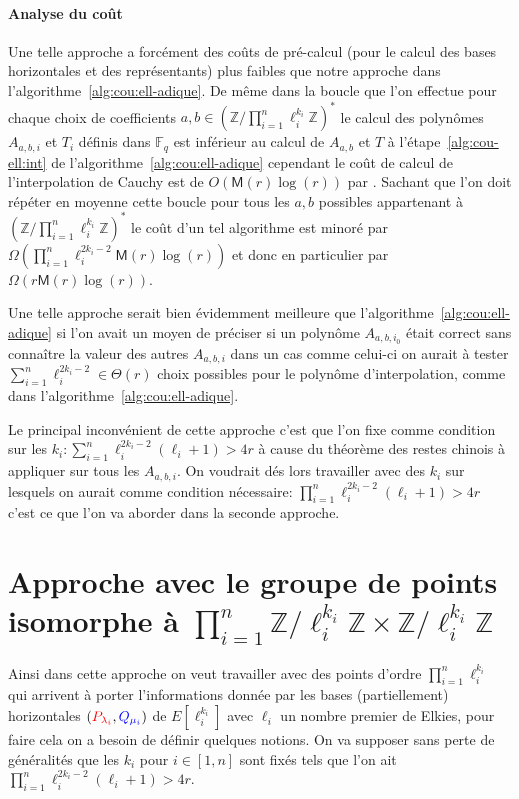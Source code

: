 \documentclass[10pt,a4paper]{book}
\theoremstyle{plain}
\theoremstyle{definition}
\theoremstyle{definition}
\theoremstyle{definition}
\theoremstyle{definition}
\theoremstyle{remark}
\theoremstyle{remark}
\theoremstyle{definition}
\begin{document}
\paragraph{Analyse du coût}
{Une telle approche a forcément des coûts de pré-calcul (pour le calcul des bases 
horizontales et des représentants) plus faibles que notre approche dans 
l'algorithme~\ref{alg:cou:ell-adique}. De même dans la boucle que l'on effectue
 pour chaque choix de coefficients $a,b \in (\mathbb{Z}/\prod_{i=1}^n\ell_i^{k_i} \mathbb{Z})^*$
le calcul des polynômes $A_{a,b,i}$ et $T_i$ définis dans $\mathbb{F}_q$ est 
inférieur au calcul de $A_{a,b}$ et $T$ à l'étape~\ref{alg:cou-ell:int} de 
l'algorithme~\ref{alg:cou:ell-adique} cependant le coût de calcul de 
l'interpolation de Cauchy  est de $O(\mathsf{M}(r)\log(r))$ par
 \cite[Théorème 7.5]{algeff17}. Sachant que l'on doit répéter en moyenne cette 
boucle pour tous les $a,b$ possibles appartenant à $(\mathbb{Z}/\prod_{i=1}^n\ell_i^{k_i} \mathbb{Z})^*$
 le coût d'un tel algorithme est minoré par $\Omega(\prod_{i=1}^n\ell_i^{2k_i-2}
 \mathsf{M}(r)\log(r))$ et donc en particulier par $\Omega(r\mathsf{M}(r)
 \log(r))$. 

Une telle approche serait bien évidemment meilleure que 
l'algorithme~\ref{alg:cou:ell-adique} si l'on avait un moyen de préciser si un 
polynôme $A_{a,b,i_0}$ était correct sans connaître la valeur des autres 
$A_{a,b,i}$ dans un cas comme celui-ci on aurait à tester 
$\sum_{i=1}^n \ell_i^{2k_i-2} \in \Theta(r)$ choix possibles pour le polynôme 
d'interpolation, comme dans l'algorithme~\ref{alg:cou:ell-adique}.

Le principal inconvénient de cette approche 
c'est que l'on fixe comme condition sur les $k_i: \sum_{i=1}^n\ell_i^{2k_{i}-2}(\ell_i+1)>4r$
à cause du théorème des restes chinois à appliquer sur tous les $A_{a,b,i}$. 
On voudrait dés lors travailler avec des $k_i$ sur lesquels on aurait comme 
condition nécessaire: $\prod_{i=1}^n\ell_i^{2k_{i}-2}(\ell_i+1)>4r$
c'est ce que l'on va aborder dans la seconde approche.}

\section{Approche avec le groupe de points isomorphe à $\prod_{i=1}^n \mathbb{Z}/\ell_i^{k_i} \mathbb{Z} \times \mathbb{Z}/\ell_i^{k_i} \mathbb{Z} $}
Ainsi dans cette approche on veut travailler avec des points d'ordre 
$\prod_{i=1}^{n} \ell_i^{k_i}$ qui arrivent à porter l'informations donnée par 
les  bases (partiellement) horizontales 
$(\color{red}P_{\lambda_i}\color{black},\color{blue}Q_{\mu_i}\color{black})$ de 
$E[\ell_i^{k_i}]$ avec $\ell_i$ un nombre premier de Elkies, pour faire cela on
a besoin de définir quelques notions. On
va supposer sans perte de généralités que les $k_i$ pour $i \in [1,n]$ sont 
fixés tels que l'on ait $\prod_{i=1}^{n} \ell_i^{2k_i-2}(\ell_i+1)>4r$.
\end{document}
